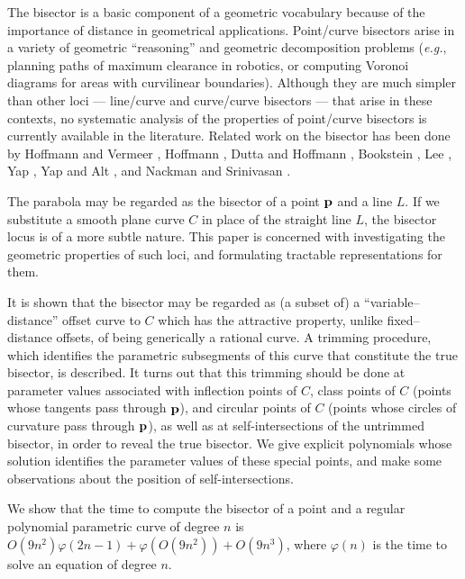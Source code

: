 The bisector is a basic component of a geometric vocabulary
because of the importance of distance in geometrical applications.
Point/curve bisectors arise in a variety of geometric ``reasoning'' 
and geometric
decomposition problems ({\it e.g.}, planning paths of maximum
clearance in robotics, or computing Voronoi diagrams for areas
with curvilinear boundaries). Although they are much simpler
than other loci --- line/curve and curve/curve bisectors ---
that arise in these contexts, no systematic analysis of the
properties of point/curve bisectors is currently available
in the literature.
Related work on the bisector has been done by Hoffmann and Vermeer \cite{HV91},
Hoffmann \cite{H90}, Dutta and Hoffmann \cite{DH90},
Bookstein \cite{bookstein79}, Lee \cite{lee82},
Yap \cite{yap87}, Yap and Alt \cite{yap89}, and
Nackman and Srinivasan \cite{nackman91}.

The parabola may be regarded as the bisector of a point ${\bf p}$ and
a line $L$.
If we substitute a smooth plane curve $C$ in place of
the straight line $L$, the bisector locus is of a more
subtle nature. This paper is concerned with investigating
the geometric properties of such loci, and formulating
tractable representations for them. 

It is shown that the bisector may be
regarded as (a subset of) a ``variable--distance'' offset curve to
$C$ which has the attractive property, unlike fixed--distance offsets,
of being generically a rational curve. 
A trimming procedure, which identifies the parametric subsegments
of this curve that constitute the true bisector, is described.
It turns out that this trimming should be done
at parameter values associated with inflection points of $C$,
class points of $C$ (points whose tangents pass through ${\bf p}$),
and circular points of $C$ (points whose circles of curvature
pass through ${\bf p}$), as well as at 
self-intersections of the untrimmed bisector,
in order to reveal the true bisector.
We give explicit polynomials whose solution identifies the parameter
values of these special points,
and make some observations about the position of self-intersections.

We show that the time to compute the bisector of a point and a 
regular polynomial parametric curve of degree $n$ is 
$O(9n^{2}) \varphi(2n-1) + \varphi(O(9n^2)) + O(9n^3)$, where 
$\varphi(n)$ is the time to solve an equation of degree $n$.

\clearpage

